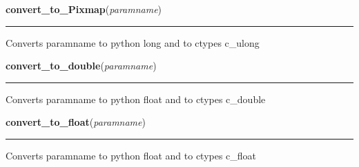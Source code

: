     \label{xformslib:library:convert_to_ulong}

    \vspace{0.5ex}

\hspace{.8\funcindent}\begin{boxedminipage}{\funcwidth}

    \raggedright \textbf{convert\_to\_Pixmap}(\textit{paramname})

    \vspace{-1.5ex}

    \rule{\textwidth}{0.5\fboxrule}
\setlength{\parskip}{2ex}
    Converts paramname to python long and to ctypes c\_ulong

\setlength{\parskip}{1ex}
    \end{boxedminipage}

    \label{xformslib:library:convert_to_double}

    \vspace{0.5ex}

\hspace{.8\funcindent}\begin{boxedminipage}{\funcwidth}

    \raggedright \textbf{convert\_to\_double}(\textit{paramname})

    \vspace{-1.5ex}

    \rule{\textwidth}{0.5\fboxrule}
\setlength{\parskip}{2ex}
    Converts paramname to python float and to ctypes c\_double

\setlength{\parskip}{1ex}
    \end{boxedminipage}

    \label{xformslib:library:convert_to_float}

    \vspace{0.5ex}

\hspace{.8\funcindent}\begin{boxedminipage}{\funcwidth}

    \raggedright \textbf{convert\_to\_float}(\textit{paramname})

    \vspace{-1.5ex}

    \rule{\textwidth}{0.5\fboxrule}
\setlength{\parskip}{2ex}
    Converts paramname to python float and to ctypes c\_float

\setlength{\parskip}{1ex}
    \end{boxedminipage}

